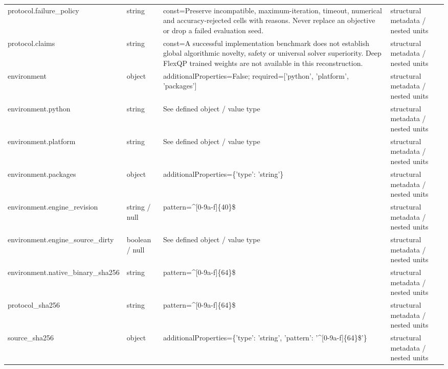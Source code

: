 \begin{longtable}{@{}>{\raggedright\arraybackslash}p{}>{\raggedright\arraybackslash}p{}>{\raggedright\arraybackslash}p{}>{\raggedright\arraybackslash}p{}@{}}
protocol.\allowbreak{}failure\_\allowbreak{}policy & string & const=\allowbreak{}Preserve incompatible, maximum-\allowbreak{}iteration, timeout, numerical and accuracy-\allowbreak{}rejected cells with reasons.\allowbreak{} Never replace an objective or drop a failed evaluation seed.\allowbreak{} & structural metadata /\allowbreak{} nested units\\
protocol.\allowbreak{}claims & string & const=\allowbreak{}A successful implementation benchmark does not establish global algorithmic novelty, safety or universal solver superiority.\allowbreak{} Deep FlexQP trained weights are not available in this reconstruction.\allowbreak{} & structural metadata /\allowbreak{} nested units\\
environment & object & additionalProperties=\allowbreak{}False; required=\allowbreak{}['python', 'platform', 'packages'] & structural metadata /\allowbreak{} nested units\\
environment.\allowbreak{}python & string & See defined object /\allowbreak{} value type & structural metadata /\allowbreak{} nested units\\
environment.\allowbreak{}platform & string & See defined object /\allowbreak{} value type & structural metadata /\allowbreak{} nested units\\
environment.\allowbreak{}packages & object & additionalProperties=\allowbreak{}\{'type': 'string'\} & structural metadata /\allowbreak{} nested units\\
environment.\allowbreak{}engine\_\allowbreak{}revision & string /\allowbreak{} null & pattern=\allowbreak{}\textasciicircum{}[0-9a-\allowbreak{}f]\{40\}\$ & structural metadata /\allowbreak{} nested units\\
environment.\allowbreak{}engine\_\allowbreak{}source\_\allowbreak{}dirty & boolean /\allowbreak{} null & See defined object /\allowbreak{} value type & structural metadata /\allowbreak{} nested units\\
environment.\allowbreak{}native\_\allowbreak{}binary\_\allowbreak{}sha256 & string & pattern=\allowbreak{}\textasciicircum{}[0-9a-\allowbreak{}f]\{64\}\$ & structural metadata /\allowbreak{} nested units\\
protocol\_\allowbreak{}sha256 & string & pattern=\allowbreak{}\textasciicircum{}[0-9a-\allowbreak{}f]\{64\}\$ & structural metadata /\allowbreak{} nested units\\
source\_\allowbreak{}sha256 & object & additionalProperties=\allowbreak{}\{'type': 'string', 'pattern': '\textasciicircum{}[0-9a-\allowbreak{}f]\{64\}\$'\} & structural metadata /\allowbreak{} nested units\\

\end{longtable}
